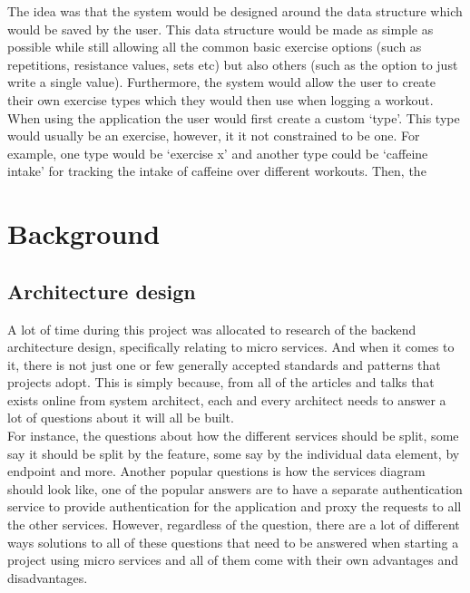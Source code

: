 \documentclass{article}
\newcommand{\vspaceconst}{-2ex}
\begin{document}
\begin{multicols}{2}
The idea was that the system would be designed around the data structure which would be saved by the user. This data structure would be made as simple as possible while still allowing all the common basic exercise options (such as repetitions, resistance values, sets etc) but also others (such as the option to just write a single value). Furthermore, the system would allow the user to create their own exercise types which they would then use when logging a workout.\\
When using the application the user would first create a custom `type'. This type would usually be an exercise, however, it it not constrained to be one. For example, one type would be `exercise x' and another type could be `caffeine intake' for tracking the intake of caffeine over different workouts. Then, the \\

\section{Background}
\vspace{\vspaceconst}

\subsection{Architecture design}
\vspace{\vspaceconst}

A lot of time during this project was allocated to research of the backend architecture design, specifically relating to micro services. And when it comes to it, there is not just one or few generally accepted standards and patterns that projects adopt. This is simply because, from all of the articles and talks that exists online from system architect, each and every architect needs to answer a lot of questions about it will all be built.\\
 For instance, the questions about how the different services should be split, some say it should be split by the feature, some say by the individual data element, by endpoint and more. Another popular questions is how the services diagram should look like, one of the popular answers are to have a separate authentication service to provide authentication for the application and proxy the requests to all the other services. However, regardless of the question, there are a lot of different ways solutions to all of these questions that need to be answered when starting a project using micro services and all of them come with their own advantages and disadvantages.\\


\end{multicols}
\end{document}
